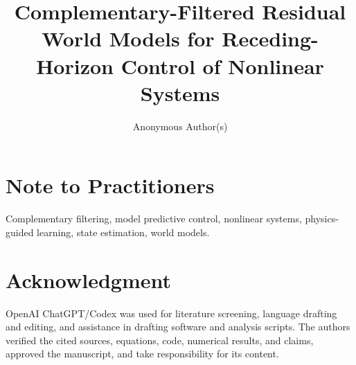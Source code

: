 \documentclass[journal]{IEEEtran}
\title{Complementary-Filtered Residual World Models for Receding-Horizon Control of Nonlinear Systems}
\author{Anonymous Author(s)}
\begin{document}
\maketitle

\begin{abstract}

\end{abstract}

\section*{Note to Practitioners}


\begin{IEEEkeywords}
Complementary filtering, model predictive control, nonlinear systems,
physics-guided learning, state estimation, world models.
\end{IEEEkeywords}








\section*{Acknowledgment}
OpenAI ChatGPT/Codex was used for literature screening, language drafting and
editing, and assistance in drafting software and analysis scripts. The authors
verified the cited sources, equations, code, numerical results, and claims,
approved the manuscript, and take responsibility for its content.

\balance


\end{document}

